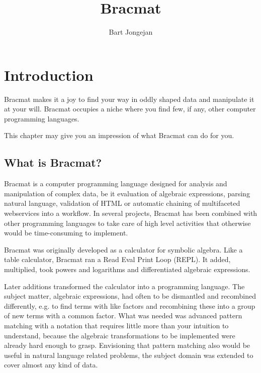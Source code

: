 \documentclass[12pt]{article}
\begin{document}
\title{Bracmat}
\author{Bart Jongejan}

\maketitle

\newpage

\tableofcontents

\newpage

\section{Introduction}

Bracmat makes it a joy to find your way in oddly shaped data and
manipulate it at your will. Bracmat occupies a niche where you find
few, if any, other computer programming languages.

This chapter may give you an impression of what Bracmat can do for
you.

\subsection{What is Bracmat?}

Bracmat is a computer programming language designed for analysis and
manipulation of complex data, be it evaluation of algebraic
expressions, parsing natural language, validation of HTML or automatic
chaining of multifaceted webservices into a workflow. In several
projects, Bracmat has been combined with other programming languages
to take care of high level activities that otherwise would be 
time-consuming to implement.

Bracmat was originally developed as a calculator for symbolic
algebra. Like a table calculator, Bracmat ran a Read Eval Print
Loop (REPL). It added, multiplied, took powers and logarithms and
differentiated algebraic expressions.

Later additions transformed the calculator into a programming
language. The subject matter, algebraic expressions, had often to be
dismantled and recombined differently, e.g. to find terms
with like factors and recombining these into a group of new terms with
a common factor. What was needed was advanced pattern matching with a
notation that requires little more than your intuition to understand,
because the algebraic transformations to be implemented were already
hard enough to grasp. Envisioning that pattern matching also would be
useful in natural language related problems, the subject domain
was extended to cover almost any kind of data.
\end{document}
